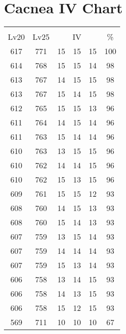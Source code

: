 \documentclass{article}%
\begin{document}
%
\normalsize%
\section{Cacnea IV Chart}%
\label{sec:Cacnea IV Chart}%
\renewcommand{\arraystretch}{1.5}%
\begin{tabular}{|c|c|c|c|c|c|}%
\hline%
\multicolumn{6}{|c|}{\textcolor{white}{ 
\linebreak{Cacnea}
}%
\cellcolor{black}}\\%
\multicolumn{1}{|c}{Lv20}&\multicolumn{1}{c|}{Lv25}&\multicolumn{3}{c|}{IV}&\multicolumn{1}{|c|}{\%}\\%
\hline%
\rowcolor{color100}%
617&771&15&15&15&100\\%
\hline%
\rowcolor{color98}%
614&768&15&15&14&98\\%
\hline%
\rowcolor{color98}%
613&767&14&15&15&98\\%
\hline%
\rowcolor{color98}%
613&767&15&14&15&98\\%
\hline%
\rowcolor{color96}%
612&765&15&15&13&96\\%
\hline%
\rowcolor{color96}%
611&764&14&15&14&96\\%
\hline%
\rowcolor{color96}%
611&763&15&14&14&96\\%
\hline%
\rowcolor{color96}%
610&763&13&15&15&96\\%
\hline%
\rowcolor{color96}%
610&762&14&14&15&96\\%
\hline%
\rowcolor{color96}%
610&762&15&13&15&96\\%
\hline%
\rowcolor{color93}%
609&761&15&15&12&93\\%
\hline%
\rowcolor{color93}%
608&760&14&15&13&93\\%
\hline%
\rowcolor{color93}%
608&760&15&14&13&93\\%
\hline%
\rowcolor{color93}%
607&759&13&15&14&93\\%
\hline%
\rowcolor{color93}%
607&759&14&14&14&93\\%
\hline%
\rowcolor{color93}%
607&759&15&13&14&93\\%
\hline%
\rowcolor{color93}%
606&758&13&14&15&93\\%
\hline%
\rowcolor{color93}%
606&758&14&13&15&93\\%
\hline%
\rowcolor{color93}%
606&758&15&12&15&93\\%
\hline%
\rowcolor{color91}%
569&711&10&10&10&67\\%
\end{tabular}

%
\end{document}

